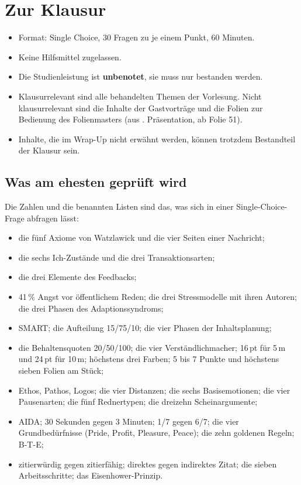 \documentclass[12pt, a4paper]{article}
\begin{document}
\section{Zur Klausur}

\begin{itemize}
  \item Format: Single Choice, 30 Fragen zu je einem Punkt, 60 Minuten.
  \item Keine Hilfsmittel zugelassen.
  \item Die Studienleistung ist \textbf{unbenotet}, sie muss nur bestanden
        werden.
  \item Klausurrelevant sind alle behandelten Themen der Vorlesung. Nicht
        klausurrelevant sind die Inhalte der Gastvorträge und die Folien zur
        Bedienung des Folienmasters (aus . Präsentation\grqq{}, ab
        Folie 51).
  \item Inhalte, die im Wrap-Up nicht erwähnt werden, können trotzdem
        Bestandteil der Klausur sein.
\end{itemize}

\subsection{Was am ehesten geprüft wird}

Die Zahlen und die benannten Listen sind das, was sich in einer Single-Choice-
Frage abfragen lässt:

\begin{itemize}
  \item die fünf Axiome von Watzlawick und die vier Seiten einer Nachricht;
  \item die sechs Ich-Zustände und die drei Transaktionsarten;
  \item die drei Elemente des Feedbacks;
  \item 41\,\% Angst vor öffentlichem Reden; die drei Stressmodelle mit ihren
        Autoren; die drei Phasen des Adaptionssyndroms;
  \item SMART; die Aufteilung 15/75/10; die vier Phasen der Inhaltsplanung;
  \item die Behaltensquoten 20/50/100; die vier Verständlichmacher; 16\,pt
        für 5\,m und 24\,pt für 10\,m; höchstens drei Farben; 5 bis 7 Punkte
        und höchstens sieben Folien am Stück;
  \item Ethos, Pathos, Logos; die vier Distanzen; die sechs Basisemotionen;
        die vier Pausenarten; die fünf Rednertypen; die dreizehn
        Scheinargumente;
  \item AIDA; 30 Sekunden gegen 3 Minuten; 1/7 gegen 6/7; die vier
        Grundbedürfnisse (Pride, Profit, Pleasure, Peace); die zehn goldenen
        Regeln; B-T-E;
  \item zitierwürdig gegen zitierfähig; direktes gegen indirektes Zitat; die
        sieben Arbeitsschritte; das Eisenhower-Prinzip.
\end{itemize}
\end{document}
